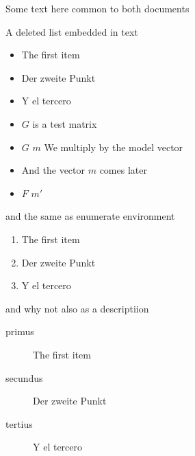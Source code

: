 \documentclass{article}
\newcommand{\vc}[1]{\mbox{$#1$}}
\begin{document}
Some text here common to both documents

A deleted list embedded in text
\begin{itemize}
 \item The first item
 \item Der zweite Punkt
 \item Y el tercero
 \item \vc{G} is a test matrix
 \item \vc{G} \vc{m} We multiply by the model vector
 \item And the vector \vc{m} comes later
 \item \vc{F} \vc{m'}
\end{itemize}
and the same as enumerate environment
\begin{enumerate}
 \item The first item
 \item Der zweite Punkt
 \item Y el tercero
\end{enumerate}
and why not also as a descriptiion
\begin{description}
 \item[primus] The first item
 \item[secundus] Der zweite Punkt
 \item[tertius] Y el tercero
\end{description}
\end{document}

